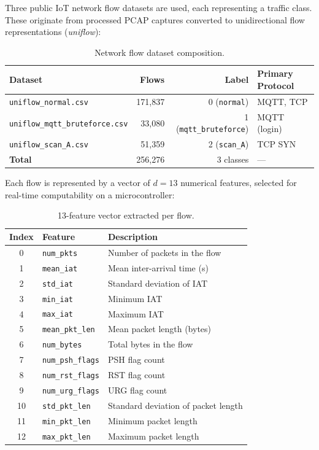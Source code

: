 Three public IoT network flow datasets are used, each representing a traffic class. These originate from processed PCAP captures converted to unidirectional flow representations (\emph{uniflow}):

\begin{table}[H]
\centering
\caption{Network flow dataset composition.}
\label{tab:dataset_comp}
\begin{tabular}{l r r l}
\toprule
\textbf{Dataset} & \textbf{Flows} & \textbf{Label} & \textbf{Primary Protocol} \\
\midrule
\texttt{uniflow\_normal.csv}           & 171,837 & 0 (\texttt{normal})           & MQTT, TCP \\
\texttt{uniflow\_mqtt\_bruteforce.csv} &  33,080 & 1 (\texttt{mqtt\_bruteforce}) & MQTT (login) \\
\texttt{uniflow\_scan\_A.csv}          &  51,359 & 2 (\texttt{scan\_A})          & TCP SYN \\
\midrule
\textbf{Total}                         & 256,276 & 3 classes & --- \\
\bottomrule
\end{tabular}
\end{table}

Each flow is represented by a vector of $d = 13$ numerical features, selected for real-time computability on a microcontroller:

\begin{table}[H]
\centering
\caption{13-feature vector extracted per flow.}
\label{tab:features}
\small
\begin{tabular}{c l l}
\toprule
\textbf{Index} & \textbf{Feature} & \textbf{Description} \\
\midrule
0  & \texttt{num\_pkts}      & Number of packets in the flow \\
1  & \texttt{mean\_iat}      & Mean inter-arrival time (s) \\
2  & \texttt{std\_iat}       & Standard deviation of IAT \\
3  & \texttt{min\_iat}       & Minimum IAT \\
4  & \texttt{max\_iat}       & Maximum IAT \\
5  & \texttt{mean\_pkt\_len} & Mean packet length (bytes) \\
6  & \texttt{num\_bytes}     & Total bytes in the flow \\
7  & \texttt{num\_psh\_flags}& PSH flag count \\
8  & \texttt{num\_rst\_flags}& RST flag count \\
9  & \texttt{num\_urg\_flags}& URG flag count \\
10 & \texttt{std\_pkt\_len}  & Standard deviation of packet length \\
11 & \texttt{min\_pkt\_len}  & Minimum packet length \\
12 & \texttt{max\_pkt\_len}  & Maximum packet length \\
\bottomrule
\end{tabular}
\end{table}


